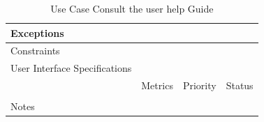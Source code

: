 \begin{table}[H]
\begin{tabularx}{\linewidth}{|l|X|X|X|}
            \hline Exceptions                    & \multicolumn{3}{l|}{}                                                                                 \\

            \hline Constraints                   & \multicolumn{3}{l|}{}                                                                                 \\

            \hline User Interface Specifications & \multicolumn{3}{l|}{}                                                                                 \\

            \hline \multirow{2}{*}{}             & Metrics                                                                           & Priority & Status \\
            \cline{2-4}                          &                                                                                   &          &        \\
            \hline Notes                         & \multicolumn{3}{l|}{}                                                                                 \\
            \hline
      \end{tabularx}
      \caption{Use Case Consult the user help Guide}
      \label{tab:use_case_consult_the_user_help_Guide}
\end{table}

